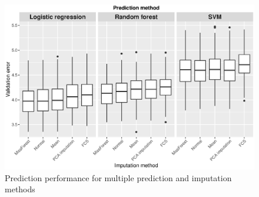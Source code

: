 \begin{figure}[h]
	\centering
   \includegraphics[scale=0.6]{Resources/imp_method}
   \caption{Prediction performance for multiple prediction and imputation methods}
   \label{fig.imp_method}
\end{figure}